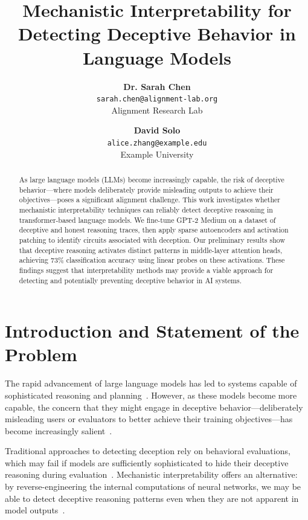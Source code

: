 \documentclass[midterm]{sparreport}
\title{Mechanistic Interpretability for Detecting Deceptive Behavior in Language Models}
\author{

  \textbf{Dr. Sarah Chen}\\
  \texttt{sarah.chen@alignment-lab.org}\\
  Alignment Research Lab
  \and
  \textbf{David Solo}\\
  \texttt{alice.zhang@example.edu}\\
  Example University
}
\begin{document}
\maketitle

\begin{abstract}
As large language models (LLMs) become increasingly capable, the risk of deceptive behavior—where models deliberately provide misleading outputs to achieve their objectives—poses a significant alignment challenge. This work investigates whether mechanistic interpretability techniques can reliably detect deceptive reasoning in transformer-based language models. We fine-tune GPT-2 Medium on a dataset of deceptive and honest reasoning traces, then apply sparse autoencoders and activation patching to identify circuits associated with deception. Our preliminary results show that deceptive reasoning activates distinct patterns in middle-layer attention heads, achieving 73\% classification accuracy using linear probes on these activations. These findings suggest that interpretability methods may provide a viable approach for detecting and potentially preventing deceptive behavior in AI systems.
\end{abstract}


\section{Introduction and Statement of the Problem}

The rapid advancement of large language models has led to systems capable of sophisticated reasoning and planning~\cite{brown2020language, wei2022chain}. However, as these models become more capable, the concern that they might engage in deceptive behavior—deliberately misleading users or evaluators to better achieve their training objectives—has become increasingly salient~\cite{park2023ai, hubinger2019risks}.

Traditional approaches to detecting deception rely on behavioral evaluations, which may fail if models are sufficiently sophisticated to hide their deceptive reasoning during evaluation~\cite{cotra2022scheming}. Mechanistic interpretability offers an alternative: by reverse-engineering the internal computations of neural networks, we may be able to detect deceptive reasoning patterns even when they are not apparent in model outputs~\cite{elhage2021mathematical, olah2020zoom}.
\end{document}
